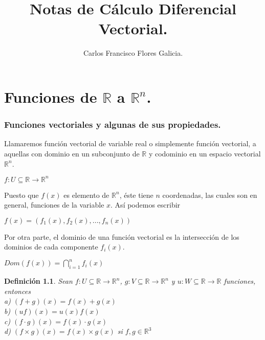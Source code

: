 \documentclass{book}
\title{Notas de Cálculo Diferencial Vectorial.}
\author{Carlos Francisco Flores Galicia.}
\date{}
\newtheorem{definition}{Definición}[section]
\begin{document}
\maketitle

\chapter{Funciones de $\mathbb{R}$ a $\mathbb{R}^n$.}
\subsection{Funciones vectoriales y algunas de sus propiedades.}


Llamaremos función vectorial de variable real o simplemente función vectorial, a aquellas con dominio en
un subconjunto de $\mathbb{R}$ y codominio en un espacio vectorial $\mathbb{R}^n$.

\begin{center}
    $f:U \subseteq \mathbb{R} \rightarrow \mathbb{R}^n$
\end{center}

Puesto que $f(x)$ es elemento de $\mathbb{R}^n$, éste tiene $n$ coordenadas, las cuales son en general, funciones de la variable $x$. Así podemos escribir

\begin{center}
    $f(x)=(f_1(x),f_2(x),...,f_n(x))$
\end{center}

Por otra parte, el dominio de una función vectorial es la intersección de los dominios de cada componente $f_i(x)$.

\begin{center}
    $\displaystyle Dom(f(x))= \bigcap^n_{i=1}f_i(x)$
\end{center}

\begin{definition}
Sean $f:U \subseteq \mathbb{R} \rightarrow \mathbb{R}^n$,  $g:V \subseteq \mathbb{R} \rightarrow \mathbb{R}^n$ y $u:W \subseteq \mathbb{R} \rightarrow \mathbb{R}$ funciones, entonces \\[1\baselineskip]
a) $(f+g)(x)=f(x)+g(x)$\\[0\baselineskip]
b) $(uf)(x)=u(x)f(x)$\\[0\baselineskip]
c) $(f \cdot g)(x)=f(x) \cdot g(x)$\\[0\baselineskip]
d) $(f \times g)(x)=f(x) \times g(x)$ si $f,g \in \mathbb{R}^3$\\[0\baselineskip]
\end{definition}
\end{document}

